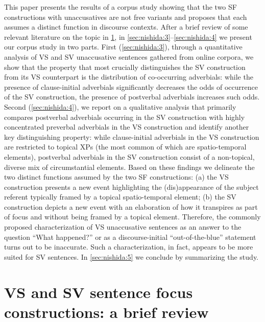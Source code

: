 \documentclass[output=paper,colorlinks,citecolor=brown,
]{langscibook}
\begin{document}
This paper presents the results of a corpus study showing that the two SF constructions with unaccusatives are not free variants and proposes that each assumes a distinct function in discourse contexts. After a brief review of some relevant literature on the topic in \ref{sec:nishida:2}, in \ref{sec:nishida:3}--\ref{sec:nishida:4} we present our corpus study in two parts. First (\ref{sec:nishida:3}), through a quantitative analysis of VS and SV unaccusative sentences gathered from online corpora, we show that the property that most crucially distinguishes the SV construction from its VS counterpart is the distribution of co-occurring adverbials: while the presence of clause-initial adverbials significantly decreases the odds of occurrence of the SV construction, the presence of postverbal adverbials increases such odds. Second (\ref{sec:nishida:4}), we report on a qualitative analysis that primarily compares postverbal adverbials occurring in the SV construction with highly concentrated preverbal adverbials in the VS construction and identify another key distinguishing property: while clause-initial adverbials in the VS construction are restricted to topical XPs (the most common of which are spatio-temporal elements), postverbal adverbials in the SV construction consist of a non-topical, diverse mix of circumstantial elements. Based on these findings we delineate the two distinct functions assumed by the two SF constructions: (a) the VS construction presents a new event highlighting the (dis)appearance of the subject referent typically framed by a topical spatio-temporal element; (b) the SV construction depicts a new event with an elaboration of how it transpires as part of focus and without being framed by a topical element.  
Therefore, the commonly proposed characterization of VS unaccusative sentences as an answer to the question ``What happened?'' or as a discourse-initial ``out-of-the-blue'' statement turns out to be inaccurate. Such a characterization, in fact, appears to be more suited for SV sentences. In \ref{sec:nishida:5} we conclude by summarizing the study.


\section{VS and SV sentence focus constructions: a brief review}\label{sec:nishida:2}
\end{document}
